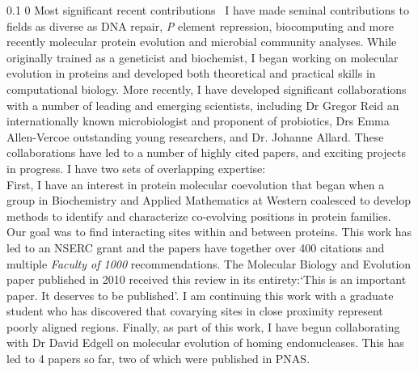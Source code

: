 \documentclass[12pt]{article}
\makeatletter
\renewcommand\section{\@startsection
	{section}{1}{0in}%
	{0.1\baselineskip}%
	{0\baselineskip}%
	{\sffamily\bfseries\large}
}
\makeatother
\begin{document}
\section{Most significant recent contributions}~
I have made seminal contributions to fields as diverse as DNA repair, \emph{P} element repression, biocomputing and more recently molecular protein evolution and microbial community analyses. While originally trained as a geneticist and biochemist, I began working on molecular evolution in proteins and developed both theoretical and practical skills in computational biology. More recently, I have developed significant collaborations with a number of leading and emerging scientists, including Dr Gregor Reid an internationally known microbiologist and proponent of probiotics, Drs Emma Allen-Vercoe outstanding young researchers, and Dr. Johanne Allard. These collaborations have led to a number of highly cited papers, and exciting projects in progress. I have two sets of overlapping expertise:\\

First, I have an interest in protein molecular coevolution that began when a group in Biochemistry and Applied Mathematics at Western coalesced to develop methods to identify and characterize co-evolving positions in protein families. Our goal was to find interacting sites within and between proteins. This work has led to an NSERC grant and the papers have together over 400 citations and multiple \emph{Faculty of 1000} recommendations. The Molecular Biology and Evolution paper published in 2010 received this review in its entirety:`This is an important paper. It deserves to be published'. I am continuing this work with a graduate student who has discovered that covarying sites in close proximity represent poorly aligned regions. Finally, as part of this work, I have begun collaborating with Dr David Edgell on molecular evolution of homing endonucleases. This has led to 4 papers so far, two of which were published in PNAS.\\
\end{document}
